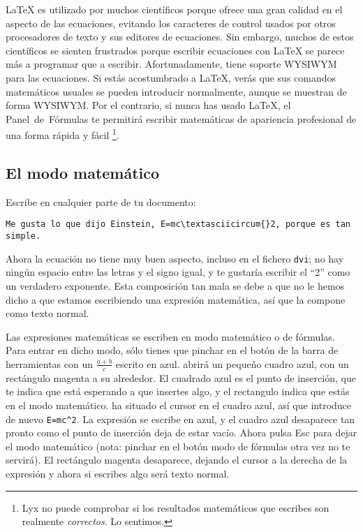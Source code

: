 \LaTeX{} es utilizado por muchos científicos porque ofrece una gran
calidad en el aspecto de las ecuaciones, evitando los caracteres de
control usados por otros procesadores de texto y sus editores de ecuaciones.
Sin embargo, muchos de estos científicos se sienten frustrados porque
escribir ecuaciones con \LaTeX{} se parece más a programar que a escribir.
Afortunadamente, \LyX{} tiene soporte WYSIWYM para las ecuaciones.
Si estás acostumbrado a \LaTeX{}, verás que sus comandos matemáticos
usuales se pueden introducir normalmente, aunque se muestran de forma
WYSIWYM. Por el contrario, si nunca has usado \LaTeX{}, el \textsf{Panel~de~Fórmulas}
te permitirá escribir matemáticas de apariencia profesional de una
forma rápida y fácil%
\footnote{Lyx no puede comprobar si los resultados matemáticos que escribes
son realmente \emph{correctos}. Lo sentimos.%
}.


\subsection{El modo matemático}

Escribe en cualquier parte de tu documento: 

\begin{verbatim}
Me gusta lo que dijo Einstein, E=mc\textasciicircum{}2, porque es tan simple. 
\end{verbatim}

Ahora la ecuación no tiene muy buen aspecto, incluso en el fichero
\texttt{dvi}; no hay ningún espacio entre las letras y el signo igual,
y te gustaría escribir el {}``2'' como un verdadero exponente. Esta
composición tan mala se debe a que no le hemos dicho a \LyX{} que
estamos escribiendo una expresión matemática, así que la compone como
texto normal.

Las expresiones matemáticas se escriben en modo matemático o de fórmulas.
Para entrar en dicho modo, sólo tienes que pinchar en el botón de
la barra de herramientas con un $\frac{a+b}{c}$ escrito en azul.
\LyX{} abrirá un pequeño cuadro azul, con un rectángulo magenta a
su alrededor. El cuadrado azul es el punto de inserción, que te indica
que está esperando a que insertes algo, y el rectangulo indica que
estás en el modo matemático. \LyX{} ha situado el cursor en el cuadro
azul, así que introduce de nuevo \texttt{E=mc\textasciicircum{}2}.
La expresión se escribe en azul, y el cuadro azul desaparece tan pronto
como el punto de inserción deja de estar vacío. Ahora pulsa \textsf{Esc}
para dejar el modo matemático (nota: pinchar en el botón modo de fórmulas
otra vez no te servirá). El rectángulo magenta desaparece, dejando
el cursor a la derecha de la expresión y ahora si escribes algo será
texto normal.

